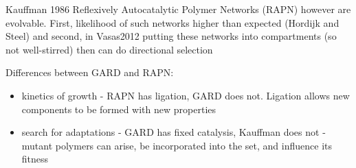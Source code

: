 Kauffman 1986 Reflexively Autocatalytic Polymer Networks (RAPN) however are
evolvable. First, likelihood of such networks higher than expected
(Hordijk and Steel) and second, in Vasas2012 putting these networks
into compartments (so not well-stirred) then can do directional
selection
	
Differences between GARD and RAPN:
	
\begin{itemize}
	\item
	
	kinetics of growth - RAPN has ligation, GARD does not. Ligation
	allows new components to be formed with new properties
	
	\item
	
	search for adaptations - GARD has fixed catalysis, Kauffman does not
	- mutant polymers can arise, be incorporated into the set, and
	influence its fitness
	
\end{itemize}
